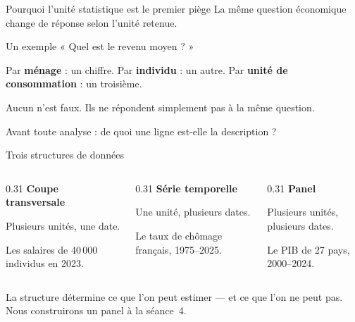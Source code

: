 \documentclass[10pt,aspectratio=169]{beamer}
\begin{document}
\begin{frame}{Pourquoi l'unité statistique est le premier piège}
La même question économique change de réponse selon l'unité retenue.

\vspace{1.2em}
\begin{block}{Un exemple}
« Quel est le revenu moyen ? »

\vspace{0.5em}
Par \textbf{ménage} : un chiffre. Par \textbf{individu} : un autre. Par \textbf{unité de consommation} : un troisième.

\vspace{0.5em}
Aucun n'est faux. Ils ne répondent simplement pas à la même question.
\end{block}

\vspace{1.2em}
Avant toute analyse : \alert{de quoi une ligne est-elle la description ?}
\end{frame}

\begin{frame}{Trois structures de données}
\begin{columns}[T]
\begin{column}{0.31\textwidth}
\textbf{Coupe transversale}

\vspace{0.5em}
Plusieurs unités, une date.

\vspace{0.5em}
\small\color{CYgris}
Les salaires de 40\,000 individus en 2023.
\end{column}
\begin{column}{0.31\textwidth}
\textbf{Série temporelle}

\vspace{0.5em}
Une unité, plusieurs dates.

\vspace{0.5em}
\small\color{CYgris}
Le taux de chômage français, 1975--2025.
\end{column}
\begin{column}{0.31\textwidth}
\textbf{Panel}

\vspace{0.5em}
Plusieurs unités, plusieurs dates.

\vspace{0.5em}
\small\color{CYgris}
Le PIB de 27 pays, 2000--2024.
\end{column}
\end{columns}

\vspace{2em}
La structure détermine ce que l'on peut estimer --- et ce que l'on ne peut pas. Nous construirons un panel à la séance~4.
\end{frame}
\end{document}
